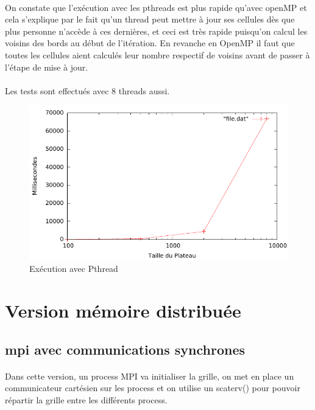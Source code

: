 \documentclass[12pt]{article}
\begin{document}
\paragraph{} On constate que l'exécution avec les pthreads est plus rapide qu'avec openMP et cela s'explique par le fait qu'un thread peut mettre à jour ses cellules dès que plus personne n'accède à ces dernières, et ceci est très rapide puisqu'on calcul les voisins des bords au début de l'itération. En revanche en OpenMP il faut que toutes les cellules aient calculés leur nombre respectif de voisins avant de passer à l'étape de mise à jour.

\paragraph{}Les tests sont effectués avec 8 threads aussi.

\begin{figure}[!h]
	\begin{center}
		\includegraphics[scale=0.5]{pthread.pdf}
	\end{center}
	\caption{Exécution avec Pthread \label{fig:life_pthread}}
\end{figure}

\section{Version mémoire distribuée}
\subsection{mpi avec communications synchrones}
\paragraph{} Dans cette version, un process MPI va initialiser la grille, on met en place un communicateur cartésien sur les process et on utilise un scaterv() pour pouvoir répartir la grille entre les différents process.
\end{document}
